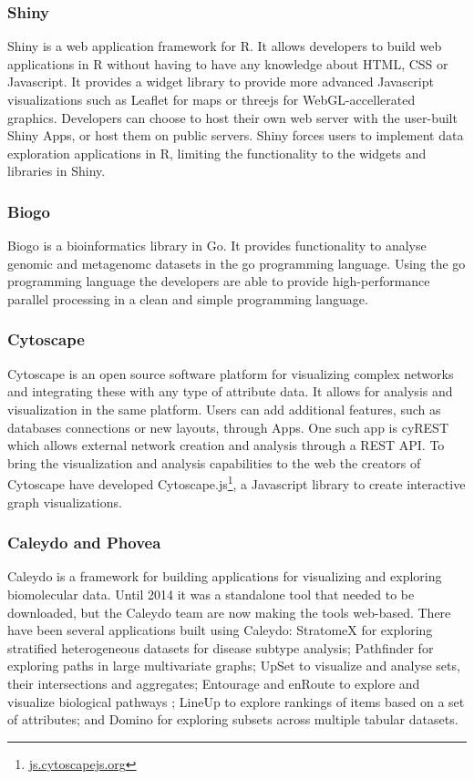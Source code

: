 \subsubsection*{Shiny} 
Shiny is a web application framework for R.\cite{shiny} It allows developers to
build web applications in R without having to have any knowledge about HTML, CSS
or Javascript. It provides a widget library to provide more advanced Javascript
visualizations such as Leaflet for maps or threejs for WebGL-accellerated
graphics. Developers can choose to host their own web server with the user-built
Shiny Apps, or host them on public servers. Shiny forces users to implement data
exploration applications in R, limiting the functionality to the 
widgets and libraries in Shiny. 


\subsubsection*{Biogo} 
Biogo is a bioinformatics library in Go. It provides functionality to analyse
genomic and metagenomc datasets in the go programming
language.\cite{Kortschak005033} Using the go programming language the developers
are able to provide high-performance parallel processing in a clean and simple
programming language. 

\subsubsection*{Cytoscape} 
Cytoscape is an open source software platform for visualizing complex
networks and integrating these with any type of attribute
data\cite{shannon2003cytoscape}. It allows for analysis and visualization in the
same platform. Users can add additional features, such as databases connections
or new layouts, through Apps. One such app is cyREST which allows external network
creation and analysis through a REST API\cite{ono2015cyrest}.
To bring the visualization and analysis
capabilities to the web the creators of Cytoscape have developed
Cytoscape.js\footnote{\url{js.cytoscapejs.org}}, a Javascript library to create
interactive graph visualizations. 



\subsubsection*{Caleydo and Phovea} 
Caleydo is a framework for building applications for visualizing and exploring
biomolecular data\cite{cleydo}. Until 2014 it was a standalone tool that needed
to be downloaded, but the Caleydo team are now making the tools web-based. There
have been several applications built using Caleydo: StratomeX for exploring
stratified heterogeneous datasets for disease subtype analysis\cite{stratomex};
Pathfinder for exploring paths in large multivariate graphs\cite{pathfinder};
UpSet to visualize and analyse sets, their intersections and
aggregates\cite{upset}; Entourage and enRoute to explore and visualize
biological pathways \cite{entourage}\cite{enroute}; LineUp to explore rankings
of items based on a set of attributes\cite{lineup}; and Domino for exploring
subsets across multiple tabular datasets\cite{domino}. 

